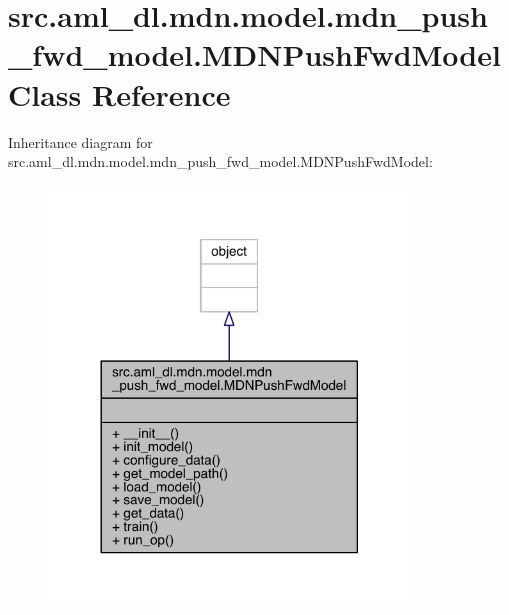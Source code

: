 \hypertarget{classsrc_1_1aml__dl_1_1mdn_1_1model_1_1mdn__push__fwd__model_1_1_m_d_n_push_fwd_model}{}\section{src.\+aml\+\_\+dl.\+mdn.\+model.\+mdn\+\_\+push\+\_\+fwd\+\_\+model.\+M\+D\+N\+Push\+Fwd\+Model Class Reference}
\label{classsrc_1_1aml__dl_1_1mdn_1_1model_1_1mdn__push__fwd__model_1_1_m_d_n_push_fwd_model}


Inheritance diagram for src.\+aml\+\_\+dl.\+mdn.\+model.\+mdn\+\_\+push\+\_\+fwd\+\_\+model.\+M\+D\+N\+Push\+Fwd\+Model\+:
\nopagebreak
\begin{figure}[H]
\begin{center}
\leavevmode
\includegraphics[width=272pt]{classsrc_1_1aml__dl_1_1mdn_1_1model_1_1mdn__push__fwd__model_1_1_m_d_n_push_fwd_model__inherit__graph}
\end{center}
\end{figure}


